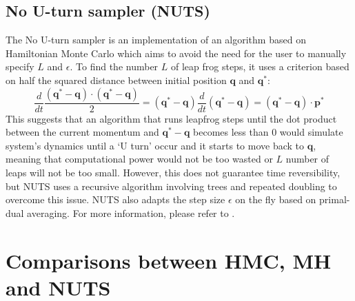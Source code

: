 \documentclass[11pt]{article}
\begin{document}
\subsection{No U-turn sampler (NUTS)}
The No U-turn sampler\cite{NUTS} is an implementation of an algorithm based on Hamiltonian Monte Carlo which aims to avoid the need for the user to manually specify $L$ and $\epsilon$. To find the number $L$ of leap frog steps, it uses a criterion based on half the squared distance between initial position $\mathbf{q}$ and $\mathbf{q^{*}}$:  
\begin{equation}
\frac{d}{dt}\frac{(\mathbf{q^{*}}-\mathbf{q}) \cdot(\mathbf{q^{*}}-\mathbf{q}) }{2}=(\mathbf{q^{*}}-\mathbf{q})\frac{d}{dt}(\mathbf{q^{*}}-\mathbf{q})=(\mathbf{q^{*}}-\mathbf{q})\cdot \mathbf{p^{*}}
\end{equation}
This suggests that an algorithm that runs leapfrog steps until the dot product between the current momentum and $\mathbf{q^{*}}-\mathbf{q}$ becomes less than $0$ would simulate system's dynamics until a `U turn' occur and it starts to move back to $\mathbf{q}$, meaning that computational power would not be too wasted or $L$ number of leaps will not be too small. However, this does not guarantee time reversibility, but NUTS uses a recursive algorithm involving trees and repeated doubling to overcome this issue. NUTS also adapts the step size $\epsilon$ on the fly based on primal-dual averaging. For more information, please refer to \cite{NUTS}.
\section{Comparisons between HMC, MH and NUTS}
\end{document}
